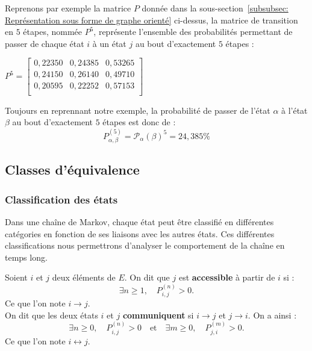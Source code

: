 \documentclass{article}
\begin{document}
\begin{tcolorbox}[colback=white,colframe=yellow!80!black,title=Exemple, breakable]
Reprenons par exemple la matrice $P$ donnée dans la sous-section~\ref{subsubsec: Représentation sous forme de graphe orienté} ci-dessus, la matrice de transition en $5$ étapes, nommée $P^{5}$, représente l'ensemble des probabilités permettant de passer de chaque état $i$ à un état $j$ au bout d'exactement $5$ étapes :
\begin{center}
$
P^{5} = \begin{bmatrix}
0,22350 & 0,24385 & 0,53265 \\
0,24150 & 0,26140 & 0,49710 \\
0,20595 & 0,22252 & 0,57153 \\
\end{bmatrix}
$
\end{center}
Toujours en reprennant notre exemple, la probabilité de passer de l'état $\alpha$ à l'état $\beta$ au bout d'exactement $5$ étapes est donc de :
\[
P_{\alpha,\beta}^{(5)} = \mathcal{P}_\alpha(\beta)^{5} = 24,385\%
\]
\end{tcolorbox}

\newpage %
\subsection{Classes d'équivalence}

\subsubsection{Classification des états}
\label{subsubsec: Les différents types d'états}

Dans une chaîne de Markov, chaque état peut être classifié en différentes catégories en fonction de ses liaisons avec les autres états. Ces différentes classifications nous permettrons d'analyser le comportement de la chaîne en temps long.

\begin{tcolorbox}[colback=white,colframe=red!80!black,title=Accessibilité et communication]
Soient $i$ et $j$ deux éléments de $E$. On dit que $j$ est \textbf{accessible} à partir de $i$ si :
\[
\exists n \geq 1, \quad P_{i,j}^{(n)} > 0.
\]
Ce que l'on note $i \to j$. \\

On dit que les deux états $i$ et $j$ \textbf{communiquent} si $i \rightarrow j$ et $j \rightarrow i$. On a ainsi :
\[
\exists n \geq 0, \quad P_{i,j}^{(n)} > 0 \quad \text{et} \quad \exists m \geq 0, \quad P_{j,i}^{(m)} > 0.
\]
Ce que l'on note $i \leftrightarrow j$.
\end{tcolorbox}
\end{document}
